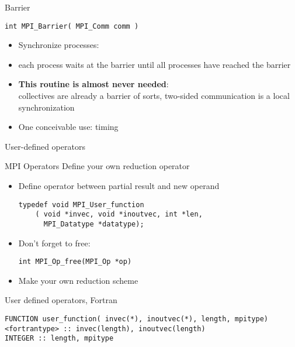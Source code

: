 \begin{numberedframe}{Barrier}
\begin{lstlisting}
int MPI_Barrier( MPI_Comm comm )
\end{lstlisting}
  \begin{itemize}
  \item Synchronize processes:
  \item each process waits at the barrier until all processes have reached the barrier
  \item \textbf{This routine is almost never needed}:\\
    collectives are already a barrier of sorts, two-sided
    communication is a local synchronization
  \item One conceivable use: timing
  \end{itemize}
\end{numberedframe}

 {User-defined operators}

\begin{numberedframe}{MPI Operators}
  Define your own reduction operator
  \begin{itemize}
  \item Define operator between partial result and new operand
\lstset{language=C}
\begin{lstlisting}
typedef void MPI_User_function
    ( void *invec, void *inoutvec, int *len, 
      MPI_Datatype *datatype); 
\end{lstlisting}
\item Don't forget to free:
\lstset{language=C}
\begin{lstlisting}
int MPI_Op_free(MPI_Op *op)  
\end{lstlisting}
\item Make your own reduction scheme 
  \end{itemize}
\end{numberedframe}

\begin{fortran}
  \addtocounter{slidecount}{-1}
\begin{numberedframe}{User defined operators, Fortran}
\lstset{language=Fortran}
\begin{lstlisting}
FUNCTION user_function( invec(*), inoutvec(*), length, mpitype)
<fortrantype> :: invec(length), inoutvec(length) 
INTEGER :: length, mpitype
\end{lstlisting}
\end{numberedframe}
\end{fortran}

